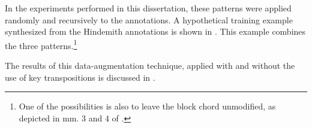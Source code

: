 In the experiments performed in this dissertation, these
patterns were applied randomly and recursively to the
annotations. A hypothetical training example synthesized
from the Hindemith annotations is shown in
. This example combines the
three patterns.\footnote{One of the possibilities is also to
leave the block chord unmodified, as depicted in mm. 3 and 4
of .}


The results of this data-augmentation technique, applied
with and without the use of key transpositions is discussed
in .
